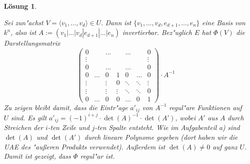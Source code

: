 \documentclass[a4paper, 12pt, numbers=noendperiod, chapterprefix=true]{scrbook}
\theoremstyle{break}
\newtheorem{Loes}{L\"osung}
\theoremstyle{nonumberbreak}
\theoremstyle{nonumberplain}
\begin{document}
\begin{Loes}
\begin{enumerate}[a)]
	Sei zun"achst $V = \langle v_1, \dots, v_d \rangle \in U$. Dann ist $\{v_1, \dots, v_d, e_{d+1}, \dots, e_n\}$ eine Basis von $k^n$, also ist $A := (v_1 | \dots |v_d|e_{d+1}|\dots|e_n)$ invertierbar. Bez"uglich $E$ hat $\Phi(V)$ die Darstellungsmatrix 
		\[\begin{pmatrix}
			0& &\dots && \dots && 0 \\
			\vdots &&&&&& \vdots \\
			0 && \dots && \dots && 0 \\
			0 & \dots & 0 & 1 & 0 &\dots &0\\
			\vdots & & \vdots & 0 &\ddots& \ddots & \vdots\\
			\vdots & & \vdots & \vdots & \ddots&\ddots&0 \\
			0 & \dots &0 & 0 &\dots &0& 1
			\end{pmatrix}
			\cdot A^{-1}
		\]
	Zu zeigen bleibt damit, dass die Eintr"age $a'_{ij}$ von $A^{-1}$ regul"are Funktionen auf $U$ sind. Es gilt $a'_{ij} = (-1)^{i+j} \cdot \det(A)^{-1} \cdot \det(A')$, wobei $A'$ aus $A$ durch Streichen der $i$-ten Zeile und $j$-ten Spalte entsteht. Wie im Aufgabenteil a) sind $\det(A)$ und $\det(A')$ durch lineare Polynome gegeben (dort haben wir die UAE des "au\ss eren Produkts verwendet). Au\ss erdem ist $\det(A)\neq 0$ auf ganz $U$. Damit ist gezeigt, dass $\Phi$ regul"ar ist.


\end{enumerate}
\end{Loes}
\end{document}
